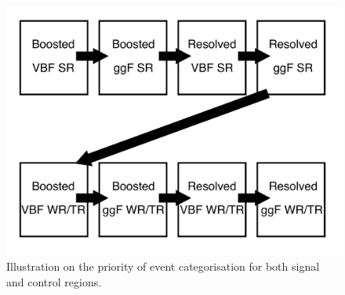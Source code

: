 \begin{figure}[h]
	\centering
	\includegraphics[width=0.75\hsize]{Chapter3/order}
	\caption{Illustration on the priority of event categorisation for both signal and control regions.}
	\label{Fig:order}
\end{figure}

